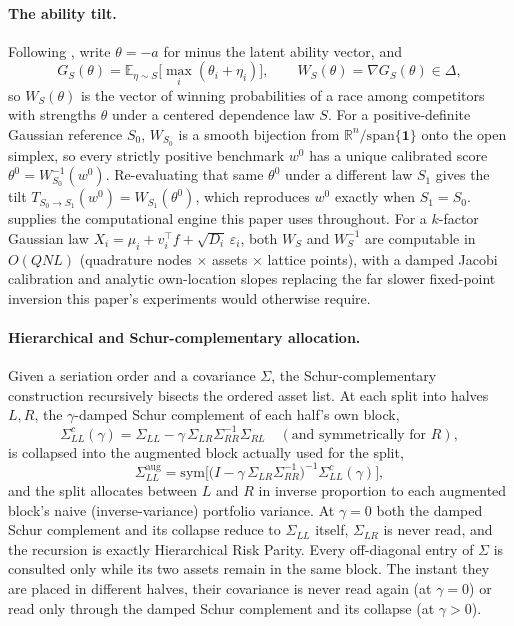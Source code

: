\documentclass[11pt]{article}
\newcommand{\E}{\mathbb{E}}
\newcommand{\R}{\mathbb{R}}
\begin{document}
\paragraph{The ability tilt.} Following \textcite{cotton2026polish}, write
$\theta=-a$ for minus the latent ability vector, and
\[
  G_S(\theta) = \E_{\eta\sim S}\big[\max_i(\theta_i+\eta_i)\big], \qquad
  W_S(\theta) = \nabla G_S(\theta) \in \Delta,
\]
so $W_S(\theta)$ is the vector of winning probabilities of a race among
competitors with strengths $\theta$ under a centered dependence law $S$. For
a positive-definite Gaussian reference $S_0$, $W_{S_0}$ is a smooth bijection
from $\R^n/\mathrm{span}\{\mathbf 1\}$ onto the open simplex, so every
strictly positive benchmark $w^0$ has a unique calibrated score
$\theta^0=W_{S_0}^{-1}(w^0)$. Re-evaluating that same $\theta^0$ under a
different law $S_1$ gives the tilt $T_{S_0\to S_1}(w^0)=W_{S_1}(\theta^0)$,
which reproduces $w^0$ exactly when $S_1=S_0$.
\textcite{cotton2026factorprobit} supplies the computational engine this
paper uses throughout. For a $k$-factor Gaussian law
$X_i=\mu_i+v_i^\top f+\sqrt{D_i}\,\varepsilon_i$, both $W_S$ and $W_S^{-1}$
are computable in $O(QNL)$ (quadrature nodes $\times$ assets $\times$ lattice
points), with a damped Jacobi calibration and analytic own-location slopes
replacing the far slower fixed-point inversion this paper's experiments would
otherwise require.

\paragraph{Hierarchical and Schur-complementary allocation.} Given a
seriation order and a covariance $\Sigma$, the Schur-complementary
construction \parencite{cotton2024schur} recursively bisects the ordered
asset list. At each split into halves $L,R$, the $\gamma$-damped Schur
complement of each half's own block,
\[
  \Sigma_{LL}^c(\gamma) = \Sigma_{LL} - \gamma\,\Sigma_{LR}\Sigma_{RR}^{-1}\Sigma_{RL}
  \quad(\text{and symmetrically for } R),
\]
is collapsed into the augmented block actually used for the split,
\[
  \Sigma_{LL}^{\mathrm{aug}} = \mathrm{sym}\Big[\big(I - \gamma\,\Sigma_{LR}\Sigma_{RR}^{-1}\big)^{-1}\Sigma_{LL}^c(\gamma)\Big],
\]
and the split allocates between $L$ and $R$ in inverse proportion to each
augmented block's naive (inverse-variance) portfolio variance. At $\gamma=0$
both the damped Schur complement and its collapse reduce to $\Sigma_{LL}$
itself, $\Sigma_{LR}$ is never read, and the recursion is exactly
Hierarchical Risk Parity. Every off-diagonal entry of $\Sigma$ is consulted
only while its two assets remain in the same block. The instant they are
placed in different halves, their covariance is never read again (at
$\gamma=0$) or read only through the damped Schur complement and its
collapse (at $\gamma>0$).
\end{document}
